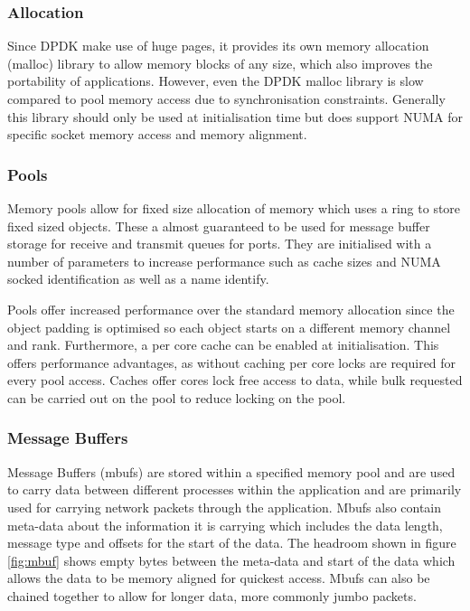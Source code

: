 \documentclass[final_report.tex]{subfiles}
\begin{document}
\subsubsection{Allocation}
Since DPDK make use of huge pages, it provides its own memory allocation (malloc) library to allow memory blocks of any size, which also improves the portability of applications. However, even the DPDK malloc library is slow compared to pool memory access due to synchronisation constraints. Generally this library should only be used at initialisation time but does support NUMA for specific socket memory access and memory alignment.

\subsubsection{Pools}
Memory pools allow for fixed size allocation of memory which uses a ring to store fixed sized objects. These a almost guaranteed to be used for message buffer storage for receive and transmit queues for ports. They are initialised with a number of parameters to increase performance such as cache sizes and NUMA socked identification as well as a name identify.

Pools offer increased performance over the standard memory allocation since the object padding is optimised so each object starts on a different memory channel and rank. Furthermore, a per core cache can be enabled at initialisation. This offers performance advantages, as without caching per core locks are required for every pool access. Caches offer cores lock free access to data, while bulk requested can be carried out on the pool to reduce locking on the pool.

\subsubsection{Message Buffers}
Message Buffers (mbufs) are stored within a specified memory pool and are used to carry data between different processes within the application and are primarily used for carrying network packets through the application. Mbufs also contain meta-data about the information it is carrying which includes the data length, message type and offsets for the start of the data. The headroom shown in figure \ref{fig:mbuf} shows empty bytes between the meta-data and start of the data which allows the data to be memory aligned for quickest access. Mbufs can also be chained together to allow for longer data, more commonly jumbo packets.
\end{document}
